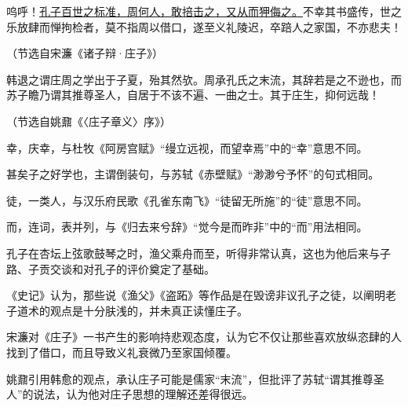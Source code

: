\documentclass[11pt,a4paper]{ctexart}
\begin{document}
\begin{materialtext}
呜呼！\uline{孔子百世之标准，周何人，敢掊击之，又从而狎侮之。}不幸其书盛传，世之乐放肆而惮拘检者，莫不指周以借口，遂至义礼陵迟，卒踣人之家国，不亦悲夫！
\end{materialtext}
\begin{flushright}（节选自宋濂《诸子辩·庄子》）\end{flushright}

\begin{materialtext}
韩退之谓庄周之学出于子夏，殆其然欤。周承孔氏之末流，其辞若是之不逊也，而苏子瞻乃谓其推尊圣人，自居于不该不遍、一曲之士。其于庄生，抑何远哉！
\end{materialtext}
\begin{flushright}（节选自姚鼐《〈庄子章义〉序》）\end{flushright}



\begin{choices}
\item 幸，庆幸，与杜牧《阿房宫赋》“缦立远视，而望幸焉”中的“幸”意思不同。
\item 甚矣子之好学也，主谓倒装句，与苏轼《赤壁赋》“渺渺兮予怀”的句式相同。
\item 徒，一类人，与汉乐府民歌《孔雀东南飞》“徒留无所施”的“徒”意思不同。
\item 而，连词，表并列，与《归去来兮辞》“觉今是而昨非”中的“而”用法相同。
\end{choices}

\begin{choices}
\item 孔子在杏坛上弦歌鼓琴之时，渔父乘舟而至，听得非常认真，这也为他后来与子路、子贡交谈和对孔子的评价奠定了基础。
\item 《史记》认为，那些说《渔父》《盗跖》等作品是在毁谤非议孔子之徒，以阐明老子道术的观点是十分肤浅的，并未真正读懂庄子。
\item 宋濂对《庄子》一书产生的影响持悲观态度，认为它不仅让那些喜欢放纵恣肆的人找到了借口，而且导致义礼衰微乃至家国倾覆。
\item 姚鼐引用韩愈的观点，承认庄子可能是儒家“末流”，但批评了苏轼“谓其推尊圣人”的说法，认为他对庄子思想的理解还差得很远。
\end{choices}
\end{document}
